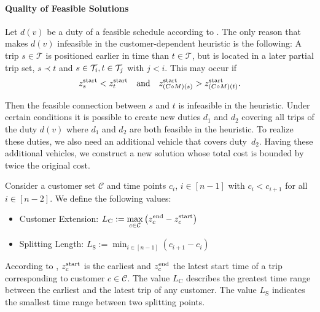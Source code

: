 \paragraph{Quality of Feasible Solutions} \parfill

Let $d(v)$ be a duty of a feasible schedule according to . The only reason that makes $d(v)$ infeasible in the customer-dependent heuristic is the following: A trip ${s\in\mathcal{T}}$ is positioned earlier in time than ${t\in\mathcal{T}}$, but is located in a later partial trip set, \ie ${s\prec t}$ and ${s\in\mathcal{T}_i}, {t\in\mathcal{T}_j}$ with ${j<i}$. This may occur if
\begin{align*}
	z^{\operatorname{start}}_s < z^{\operatorname{start}}_t && \text{and} && z^{\operatorname{start}}_{(C\circ M)(s)} > z^{\operatorname{start}}_{(C\circ M)(t)}.
\end{align*}

Then the feasible connection between $s$ and $t$ is infeasible in the heuristic. Under certain conditions it is possible to create new duties $d_1$ and $d_2$ covering all trips of the duty $d(v)$ where $d_1$ and $d_2$ are both feasible in the heuristic. To realize these duties, we also need an additional vehicle that covers duty~$d_2$. Having these additional vehicles, we construct a new solution whose total cost is bounded by twice the original cost.

\begin{definition}

Consider a customer set $\mathcal{C}$ and time points $c_i$, $i\in[n-1]$ with $c_i<c_{i+1}$ for all $i\in[n-2]$. We define the following values:
\begin{itemize}
	\item{Customer Extension: $\displaystyle{L_{\operatorname{C}} := \max_{c\in\mathcal{C}} \left(z^{\operatorname{end}}_c - z^{\operatorname{start}}_c\right)}$}
	\item{Splitting Length: $\displaystyle{L_{\operatorname{S}} := \min_{i\in[n-1]} \left(c_{i+1}-c_i\right)}$}
\end{itemize}

\end{definition}

According to , $z^{\operatorname{start}}_c$ is the earliest and $z^{\operatorname{end}}_c$ the latest start time of a trip corresponding to customer ${c\in\mathcal{C}}$. The value $L_{\operatorname{C}}$ describes the greatest time range between the earliest and the latest trip of any customer. The value $L_{\operatorname{S}}$ indicates the smallest time range between two splitting points. 

